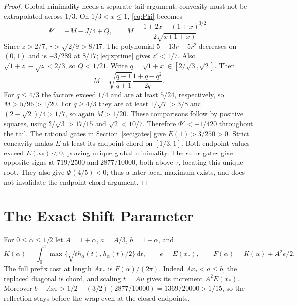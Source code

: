 \documentclass[11pt,letterpaper]{article}
\newcommand{\dd}{\,\mathrm d}
\begin{document}
\begin{proof}
Global minimality needs a separate tail argument; convexity must not be
extrapolated across $1/3$. On $1/3<x\le1$, \eqref{eq:Phi} becomes
\[
 \Phi'=-M-J/4+Q,\qquad
 M=\frac{1+2x-(1+x)^{3/2}}{2\sqrt{x(1+x)}}.
\]
Since $z>2/7$, $r>\sqrt{2/9}>8/17$. The polynomial
$5-13r+5r^2$ decreases on $(0,1)$ and is $-3/289$ at $8/17$;
\eqref{eq:zprime} gives $z'<1/7$. Also
$\sqrt{1+z}-\sqrt z<2/3$, so $Q<1/21$.
Write $q=\sqrt{1+x}\in[2/\sqrt3,\sqrt2]$. Then
\[
 M=\sqrt{\frac{q-1}{q+1}}\frac{1+q-q^2}{2q}.
\]
For $q\le4/3$ the factors exceed $1/4$ and are at least $5/24$,
respectively, so $M>5/96>1/20$. For $q\ge4/3$ they are at least
$1/\sqrt7>3/8$ and $(2-\sqrt2)/4>1/7$, so again $M>1/20$.
These comparisons follow by positive squares, using
$2/\sqrt3>17/15$ and $\sqrt2<10/7$. Therefore
$\Phi'<-1/420$ throughout the tail.
The rational gates in Section~\ref{sec:gates} give $E(1)>3/250>0$.
Strict concavity makes $E$ at least its endpoint chord on $[1/3,1]$.
Both endpoint values exceed $E(x_*)<0$, proving unique global
minimality. The same gates give opposite signs at $719/2500$ and
$2877/10000$, both above $\tau$, locating this unique root. They also
give $\Phi(4/5)<0$; thus a later local maximum exists, and does not
invalidate the endpoint-chord argument.
\end{proof}

\section{The Exact Shift Parameter}\label{sec:alpha}
For $0\le\alpha\le1/2$ let $A=1+\alpha$, $a=A/3$, $b=1-\alpha$,
and
\[
 K(\alpha)=\int_0^1\max\{\sqrt{t h_\alpha(t)},h_\alpha(t)/2\}\dd t,
 \qquad e=E(x_*),\qquad F(\alpha)=K(\alpha)+A^2e/2.
\]
The full prefix cost at length $Ax_*$ is $F(\alpha)/(2\pi)$.
Indeed $Ax_*<a\le b$, the replaced diagonal is chord, and scaling
$t=Au$ gives its increment $A^2E(x_*)$. Moreover
$b-Ax_*>1/2-(3/2)(2877/10000)=1369/20000>1/15$,
so the reflection stays before the wrap even at the closed endpoints.
\end{document}
